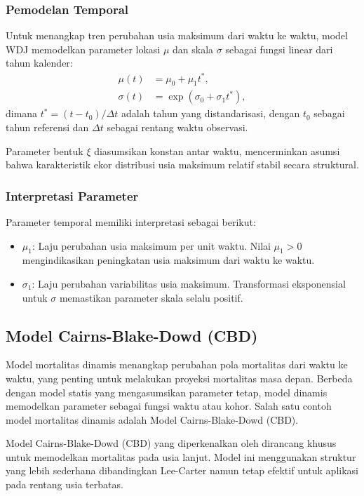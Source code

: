 \subsubsection{Pemodelan Temporal}

Untuk menangkap tren perubahan usia maksimum dari waktu ke waktu, model WDJ memodelkan parameter lokasi $\mu$ dan skala $\sigma$ sebagai fungsi linear dari tahun kalender:
\begin{align}
\mu(t) &= \mu_0 + \mu_1 t^*, \label{eq:wdj_mu} \\
\sigma(t) &= \exp(\sigma_0 + \sigma_1 t^*), \label{eq:wdj_sigma}
\end{align}
dimana $t^* = (t - t_0)/\Delta t$ adalah tahun yang distandarisasi, dengan $t_0$ sebagai tahun referensi dan $\Delta t$ sebagai rentang waktu observasi.

Parameter bentuk $\xi$ diasumsikan konstan antar waktu, mencerminkan asumsi bahwa karakteristik ekor distribusi usia maksimum relatif stabil secara struktural.

\subsubsection{Interpretasi Parameter}

Parameter temporal memiliki interpretasi sebagai berikut:
\begin{itemize}
    \item \textbf{$\mu_1$}: Laju perubahan usia maksimum per unit waktu. Nilai $\mu_1 > 0$ mengindikasikan peningkatan usia maksimum dari waktu ke waktu.
    
    \item \textbf{$\sigma_1$}: Laju perubahan variabilitas usia maksimum. Transformasi eksponensial untuk $\sigma$ memastikan parameter skala selalu positif.
\end{itemize}

\subsection{Model Cairns-Blake-Dowd (CBD)}

Model mortalitas dinamis menangkap perubahan pola mortalitas dari waktu ke waktu, yang penting untuk melakukan proyeksi mortalitas masa depan. Berbeda dengan model statis yang mengasumsikan parameter tetap, model dinamis memodelkan parameter sebagai fungsi waktu atau kohor. Salah satu contoh model mortalitas dinamis adalah Model Cairns-Blake-Dowd (CBD).

Model Cairns-Blake-Dowd (CBD) yang diperkenalkan oleh \citet{cairns2006two} dirancang khusus untuk memodelkan mortalitas pada usia lanjut. Model ini menggunakan struktur yang lebih sederhana dibandingkan Lee-Carter namun tetap efektif untuk aplikasi pada rentang usia terbatas.


